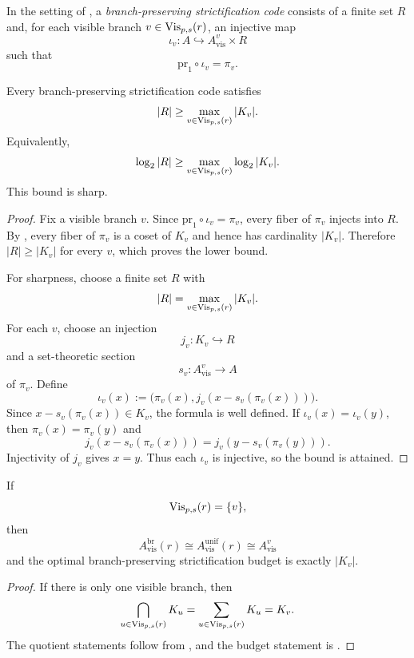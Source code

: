 \begin{definition}\label{def:branch-preserving-strictification-code}
In the setting of , a \emph{branch-preserving strictification code} consists of a finite set $R$ and, for each visible branch $v\in \mathrm{Vis}_{p,s}(r)$, an injective map
\[
\iota_v:A\hookrightarrow A_{\mathrm{vis}}^v\times R
\]
such that
\[
\mathrm{pr}_1\circ \iota_v=\pi_v.
\]
\end{definition}

\begin{theorem}\label{thm:multi-branch-strictification-budget}
Every branch-preserving strictification code satisfies
\[
|R|\ge \max_{v\in \mathrm{Vis}_{p,s}(r)} |K_v|.
\]
Equivalently,
\[
\log_2|R|\ge \max_{v\in \mathrm{Vis}_{p,s}(r)} \log_2|K_v|.
\]
This bound is sharp.
\end{theorem}

\begin{proof}
Fix a visible branch $v$. Since $\mathrm{pr}_1\circ \iota_v=\pi_v$, every fiber of $\pi_v$ injects into $R$. By , every fiber of $\pi_v$ is a coset of $K_v$ and hence has cardinality $|K_v|$. Therefore $|R|\ge |K_v|$ for every $v$, which proves the lower bound.

For sharpness, choose a finite set $R$ with
\[
|R|=\max_{v\in \mathrm{Vis}_{p,s}(r)} |K_v|.
\]
For each $v$, choose an injection
\[
j_v:K_v\hookrightarrow R
\]
and a set-theoretic section
\[
s_v:A_{\mathrm{vis}}^v\to A
\]
of $\pi_v$. Define
\[
\iota_v(x):=\bigl(\pi_v(x),j_v(x-s_v(\pi_v(x)))\bigr).
\]
Since $x-s_v(\pi_v(x))\in K_v$, the formula is well defined. If $\iota_v(x)=\iota_v(y)$, then $\pi_v(x)=\pi_v(y)$ and
\[
j_v(x-s_v(\pi_v(x)))=j_v(y-s_v(\pi_v(y))).
\]
Injectivity of $j_v$ gives $x=y$. Thus each $\iota_v$ is injective, so the bound is attained.
\end{proof}

\begin{corollary}\label{cor:single-branch-reduction}
If
\[
\mathrm{Vis}_{p,s}(r)=\{v\},
\]
then
\[
A_{\mathrm{vis}}^{\mathrm{br}}(r)\cong A_{\mathrm{vis}}^{\mathrm{unif}}(r)\cong A_{\mathrm{vis}}^v
\]
and the optimal branch-preserving strictification budget is exactly $|K_v|$.
\end{corollary}

\begin{proof}
If there is only one visible branch, then
\[
\bigcap_{u\in \mathrm{Vis}_{p,s}(r)} K_u
=
\sum_{u\in \mathrm{Vis}_{p,s}(r)} K_u
=
K_v.
\]
The quotient statements follow from , and the budget statement is .
\end{proof}

